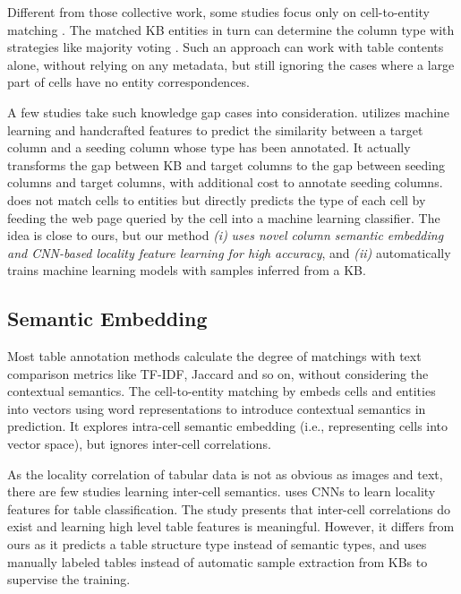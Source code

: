 \documentclass[letterpaper]{article}
\newcommand{\rv}[1]{{\color{black}#1}}
\newcommand{\camera}[1]{{\color{black}#1}}
\begin{document}
Different from those \rv{collective work, 
some studies focus only on cell-to-entity matching \cite{zwicklbauer2016doser,efthymiou2017matching,luo2018cross}.}
The matched KB entities 
in turn can determine the column type with strategies like majority voting \cite{zwicklbauer2013towards}.
Such an approach can work with table contents alone, 
without relying on any metadata, 
but still ignoring the cases where a large part of cells have no entity correspondences.

A few studies take such knowledge gap cases into consideration.
\cite{pham2016semantic} utilizes machine learning and handcrafted features to predict the similarity between a target column and a seeding column whose type has been annotated. 
It actually transforms the gap between KB and target columns to the gap between seeding columns and target columns,
\rv{with additional cost to annotate seeding columns.}
\cite{quercini2013entity} does not match cells to entities but directly predicts \rv{the type of each cell by feeding the web page queried by the cell into a machine learning classifier}.
The idea is close to ours, 
but our method \rv{
\textit{(i)} \camera{
\textit{uses novel column semantic embedding and CNN-based locality feature learning for high accuracy}}, and
\textit{(ii)} automatically trains machine learning models with samples inferred from a KB.}




\subsection{Semantic Embedding}

Most table annotation methods calculate the \camera{degree} of matchings with text comparison metrics like TF-IDF, Jaccard and so on,
without considering the contextual semantics.
The cell-to-entity matching by \cite{efthymiou2017matching}  embeds cells and entities into vectors using word representations
to introduce contextual semantics in prediction.
It explores intra-cell semantic embedding (i.e., representing cells into vector space),
but ignores inter-cell correlations.


As the locality correlation of tabular data is not as obvious as images and text, 
there are few studies \rv{learning} inter-cell semantics.
\cite{nishida2017understanding} uses CNNs to learn locality features for table classification.
The study presents that inter-cell correlations do exist and learning high level table features is meaningful.
\camera{However, it differs from ours as it predicts a table structure type instead of semantic types, and uses manually labeled tables instead of automatic sample extraction from KBs to supervise the training.}
\end{document}
